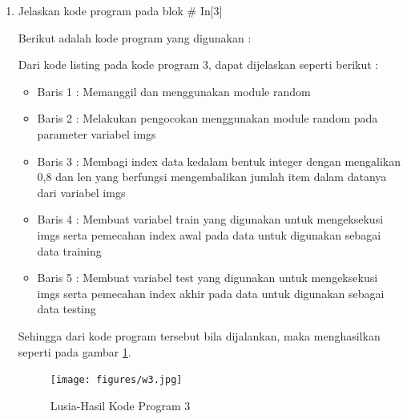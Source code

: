 \begin{enumerate}
\item Jelaskan kode program pada blok \# In[3]
	\par Berikut adalah kode program yang digunakan :
	
	\par Dari kode listing pada kode program 3, dapat dijelaskan seperti berikut :
	\begin{itemize}
	\item Baris 1	: Memanggil dan menggunakan module random
	\item Baris 2	: Melakukan pengocokan menggunakan module random pada parameter variabel imgs
	\item Baris 3	: Membagi index data kedalam bentuk integer dengan mengalikan 0,8 dan len yang berfungsi mengembalikan jumlah item dalam datanya dari variabel imgs
	\item Baris 4	: Membuat variabel train yang digunakan untuk mengeksekusi imgs serta pemecahan index awal pada data untuk digunakan sebagai data training
	\item Baris 5	: Membuat variabel test yang digunakan untuk mengeksekusi imgs serta pemecahan index akhir pada data untuk digunakan sebagai data testing
	\end{itemize}
	\par Sehingga dari kode program tersebut bila dijalankan, maka menghasilkan seperti pada gambar \ref{7B3}.
		\begin{figure}[!hbtp]
		\centering
		\texttt{[image: figures/w3.jpg]}
		\caption{Lusia-Hasil Kode Program 3}
		\label{7B3}
		\end{figure}
	

\end{enumerate}
